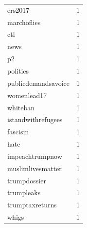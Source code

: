 \begin{tabular}{lr}
ers2017 & 1 \\
marchoflies & 1 \\
ctl & 1 \\
news & 1 \\
p2 & 1 \\
politics & 1 \\
publicdemandsavoice & 1 \\
womenlead17 & 1 \\
whiteban & 1 \\
istandwithrefugees & 1 \\
fascism & 1 \\
hate & 1 \\
impeachtrumpnow & 1 \\
muslimlivesmatter & 1 \\
trumpdossier & 1 \\
trumpleaks & 1 \\
trumptaxreturns & 1 \\
whigs & 1 \\
\bottomrule
\end{tabular}
